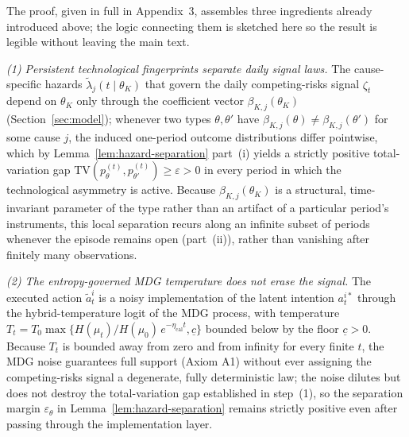 \documentclass[review,authoryear,12pt]{elsarticle}
\theoremstyle{plain}
\theoremstyle{definition}
\newcommand{\1}{\mathbf{1}}
\begin{document}
The proof, given in full in Appendix~3, assembles three ingredients already introduced above; the logic connecting them is sketched here so the result is legible without leaving the main text.

\emph{(1) Persistent technological fingerprints separate daily signal laws.} The cause-specific hazards $\tilde\lambda_j(t\mid\theta_K)$ that govern the daily competing-risks signal $\zeta_t$ depend on $\theta_K$ only through the coefficient vector $\beta_{K,j}(\theta_K)$ (Section~\ref{sec:model}); whenever two types $\theta,\theta'$ have $\beta_{K,j}(\theta)\neq\beta_{K,j}(\theta')$ for some cause $j$, the induced one-period outcome distributions differ pointwise, which by Lemma~\ref{lem:hazard-separation} part~\textup{(i)} yields a strictly positive total-variation gap $\mathrm{TV}(p_\theta^{(t)},p_{\theta'}^{(t)})\ge\varepsilon>0$ in every period in which the technological asymmetry is active. Because $\beta_{K,j}(\theta_K)$ is a structural, time-invariant parameter of the type rather than an artifact of a particular period's instruments, this local separation recurs along an infinite subset of periods whenever the episode remains open (part~\textup{(ii)}), rather than vanishing after finitely many observations.

\emph{(2) The entropy-governed MDG temperature does not erase the signal.} The executed action $\tilde a_t^i$ is a noisy implementation of the latent intention $a_t^{i\ast}$ through the hybrid-temperature logit of the MDG process, with temperature $T_t=T_0\max\{H(\mu_t)/H(\mu_0)\,e^{-\eta_{\mathrm{cal}}t},\underline{c}\}$ bounded below by the floor $\underline c>0$. Because $T_t$ is bounded away from zero and from infinity for every finite $t$, the MDG noise guarantees full support (Axiom A1) without ever assigning the competing-risks signal a degenerate, fully deterministic law; the noise dilutes but does not destroy the total-variation gap established in step~(1), so the separation margin $\varepsilon_\theta$ in Lemma~\ref{lem:hazard-separation} remains strictly positive even after passing through the implementation layer.
\end{document}
